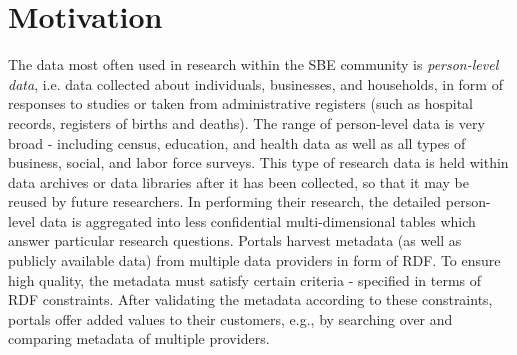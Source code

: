 \documentclass{llncs}
\begin{document}
\section{Motivation}
\label{motivation}

The data most often used in research within the SBE community is \emph{person-level data}, i.e. data collected about individuals, businesses, and households, in form of responses to studies or taken from administrative registers
(such as hospital records, registers of births and deaths). 
The range of person-level data is very broad - 
including census, education, and health data as well as all types of business, social, and labor force surveys.  
This type of research data is
held within data archives or data libraries after it has been collected, so that it may be
reused by future researchers. 
In performing their research, the detailed person-level
data is aggregated into less confidential multi-dimensional tables which answer particular research questions.
Portals harvest metadata (as well as publicly available data) from multiple data providers in form of RDF.
To ensure high quality, the metadata must satisfy certain criteria - specified in terms of RDF constraints.  
After validating the metadata according to these constraints, portals offer added values to their customers, e.g., by searching over and comparing metadata of multiple providers. 
\end{document}
